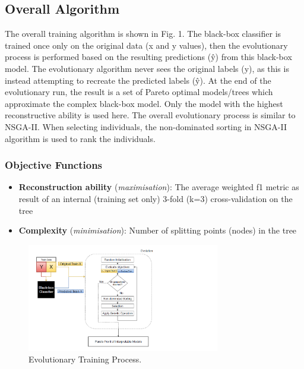 \subsection{Overall Algorithm}
The overall training algorithm is shown in Fig. 1. The black-box classifier is trained once only on the original data (x and y values), then the evolutionary process is performed based on the resulting predictions (\^{y}) from this black-box model. The evolutionary algorithm never sees the original labels (y), as this is instead attempting to recreate the predicted labels (\^{y}). At the end of the evolutionary run, the result is a set of Pareto optimal models/trees which approximate the complex black-box model. Only the model with the highest reconstructive ability is used here. The overall evolutionary process is similar to NSGA-II. When selecting individuals, the non-dominated sorting in NSGA-II algorithm is used to rank the individuals.
\subsubsection{Objective Functions}
\begin{itemize}
\item \textbf{Reconstruction ability} (\textit{maximisation}): The average weighted f1 metric as result of an internal (training set only) 3-fold (k=3) cross-validation on the tree
\end{itemize}
\begin{itemize}
\item \textbf{Complexity} (\textit{minimisation}): Number of splitting points (nodes) in the tree
\end{itemize}

\begin{figure}
\includegraphics[width=0.75\textwidth]{evolution_process}
\caption{Evolutionary Training Process.}
\end{figure}

